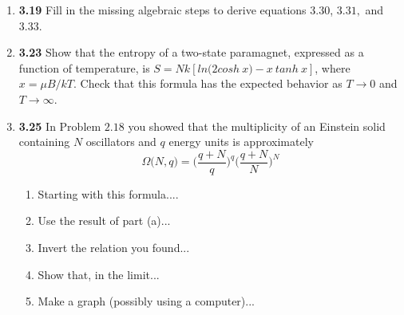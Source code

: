 \documentclass[fleqn]{article}
\begin{document}
  \begin{enumerate}
    \item \textbf{3.19} Fill in the missing algebraic steps to derive equations $3.30$, $3.31,$ and $3.33$.


    \item \textbf{3.23} Show that the entropy of a two-state paramagnet, expressed as a function of temperature, 
    is $S=N k \left[ln \bigg( 2 cosh ~ x\bigg)-x ~ tanh ~ x\right]$, where $x=\mu B/kT$. Check that this formula
    has the expected behavior as $T \longrightarrow 0$ and $T \longrightarrow \infty$.
  

    \item \textbf{3.25} In Problem $2.18$ you showed that the multiplicity of an Einstein solid containing 
    $N$ oscillators and $q$ energy units is approximately 
    $$
      \Omega \bigg( N, q \bigg)=\bigg( \dfrac{q+N}{q} \bigg)^q \bigg( \dfrac{q+N}{N} \bigg)^N
    $$
    \begin{enumerate}
      \item Starting with this formula....


      \item Use the result of part (a)...


      \item Invert the relation you found...


      \item Show that, in the limit...


      \item Make a graph (possibly using a computer)...



\end{enumerate}
\end{enumerate}
\end{document}
